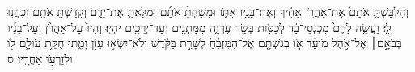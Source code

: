 \documentclass{openreader}
\begin{document}
וְהִלְבַּשְׁתָּ֤ אֹתָם֙ אֶת־אַהֲרֹ֣ן אָחִ֔יךָ וְאֶת־בָּנָ֖יו אִתֹּ֑ו וּמָשַׁחְתָּ֨ אֹתָ֜ם וּמִלֵּאתָ֧ אֶת־יָדָ֛ם וְקִדַּשְׁתָּ֥ אֹתָ֖ם וְכִהֲנ֥וּ לִֽי׃ 
וַעֲשֵׂ֤ה לָהֶם֙ מִכְנְסֵי־בָ֔ד לְכַסֹּ֖ות בְּשַׂ֣ר עֶרְוָ֑ה מִמָּתְנַ֥יִם וְעַד־יְרֵכַ֖יִם יִהְיֽוּ׃ 
וְהָיוּ֩ עַל־אַהֲרֹ֨ן וְעַל־בָּנָ֜יו בְּבֹאָ֣ם׀ אֶל־אֹ֣הֶל מֹועֵ֗ד אֹ֣ו בְגִשְׁתָּ֤ם אֶל־הַמִּזְבֵּ֨חַ֙ לְשָׁרֵ֣ת בַּקֹּ֔דֶשׁ וְלֹא־יִשְׂא֥וּ עָוֹ֖ן וָמֵ֑תוּ חֻקַּ֥ת עֹולָ֛ם לֹ֖ו וּלְזַרְעֹ֥ו אַחֲרָֽיו׃ ס 
\end{document}
